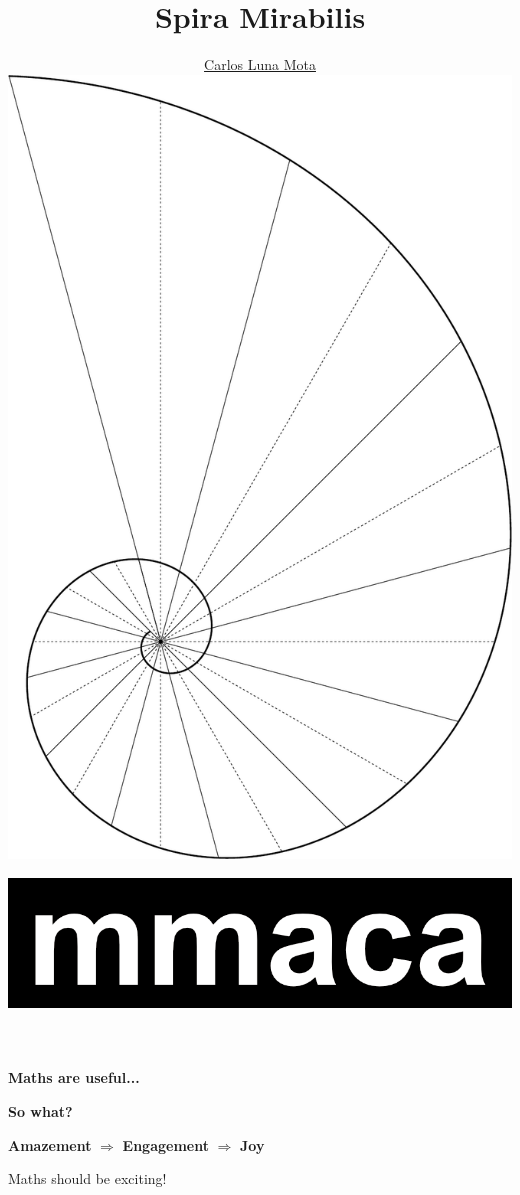 \documentclass[14pt]{beamer}
\title{\Huge Spira Mirabilis\\[-1.2ex]}
\author{{\large \href{https://github.com/CarlosLunaMota}{Carlos Luna Mota}}\\[2ex]
        \includegraphics[width=22ex, angle=90]{pictures/Spiral_Phi_90.pdf}\\[-5ex]}
\date{\href{https://mmaca.cat/}{\includegraphics[scale=0.1]{pictures/MMACA.png}}}
\begin{document}

    \begin{frame}
      \titlepage
    \end{frame}


    \begin{frame}{}
        \begin{center}
            \textbf{\Large Maths are useful...}

            \bigskip \bigskip \bigskip \bigskip
            
            \textbf{\Huge So what?}
        \end{center}
    \end{frame}


    \begin{frame}{}
        \begin{center}
            {\large \textbf{Amazement} $\Rightarrow$ \textbf{Engagement} $\Rightarrow$ \textbf{Joy}}

            {\LARGE \bigskip \bigskip \bigskip \bigskip

            {Maths should be exciting!}}
        \end{center}
    \end{frame}


    {
    \begin{frame}[plain]
    \end{frame}
    }
\end{document}

